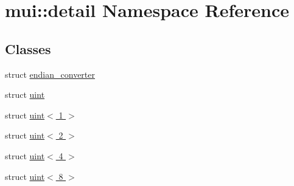 \hypertarget{namespacemui_1_1detail}{}\section{mui\+:\+:detail Namespace Reference}
\label{namespacemui_1_1detail}
\subsection*{Classes}
\begin{DoxyCompactItemize}
\item 
struct \hyperlink{structmui_1_1detail_1_1endian__converter}{endian\+\_\+converter}
\item 
struct \hyperlink{structmui_1_1detail_1_1uint}{uint}
\item 
struct \hyperlink{structmui_1_1detail_1_1uint_3_011_01_4}{uint$<$ 1 $>$}
\item 
struct \hyperlink{structmui_1_1detail_1_1uint_3_012_01_4}{uint$<$ 2 $>$}
\item 
struct \hyperlink{structmui_1_1detail_1_1uint_3_014_01_4}{uint$<$ 4 $>$}
\item 
struct \hyperlink{structmui_1_1detail_1_1uint_3_018_01_4}{uint$<$ 8 $>$}
\end{DoxyCompactItemize}
